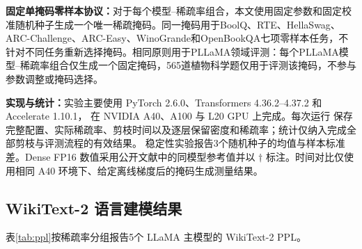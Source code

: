 \documentclass[UTF8,fontset=fandol]{ctexart}
\begin{document}
\textbf{固定单掩码零样本协议：}对于每个模型--稀疏率组合，本文使用固定参数和固定校准随机种子生成一个唯一稀疏掩码。同一掩码用于BoolQ、RTE、HellaSwag、ARC-Challenge、ARC-Easy、WinoGrande和OpenBookQA七项零样本任务，不针对不同任务重新选择掩码。相同原则用于PLLaMA领域评测：每个PLLaMA模型--稀疏率组合仅生成一个固定掩码，565道植物科学题仅用于评测该掩码，不参与参数调整或掩码选择。

\textbf{实现与统计：}实验主要使用 PyTorch 2.6.0、Transformers 4.36.2--4.37.2 和 Accelerate 1.10.1，
在 NVIDIA A40、A100 与 L20 GPU 上完成。每次运行
保存完整配置、实际稀疏率、剪枝时间以及逐层保留密度和稀疏率；统计仅纳入完成全部剪枝与评测流程的有效结果。
稳定性实验报告3个随机种子的均值与样本标准差。Dense FP16 数值采用公开文献中的同模型参考值并以
$\dagger$ 标注。时间对比仅使用相同 A40 环境下、给定离线梯度后的掩码生成测量结果。

\subsection{WikiText-2 语言建模结果}

表\ref{tab:ppl}按稀疏率分组报告5个 LLaMA 主模型的 WikiText-2 PPL。
\end{document}

